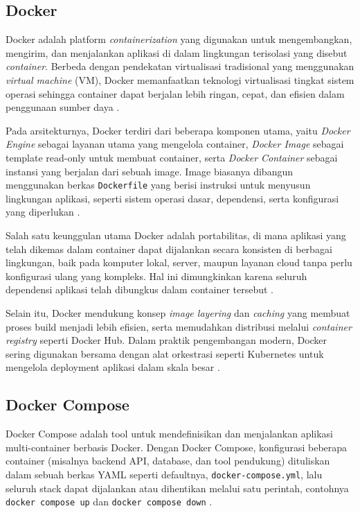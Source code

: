 \documentclass[a4paper,oneside,11pt]{book}
\begin{document}
\subsection{Docker}

\par Docker adalah platform \textit{containerization} yang digunakan untuk mengembangkan, mengirim, dan menjalankan aplikasi di dalam lingkungan terisolasi yang disebut \textit{container}. Berbeda dengan pendekatan virtualisasi tradisional yang menggunakan \textit{virtual machine} (VM), Docker memanfaatkan teknologi virtualisasi tingkat sistem operasi sehingga container dapat berjalan lebih ringan, cepat, dan efisien dalam penggunaan sumber daya \cite{docker-docs}.

\par Pada arsitekturnya, Docker terdiri dari beberapa komponen utama, yaitu \textit{Docker Engine} sebagai layanan utama yang mengelola container, \textit{Docker Image} sebagai template read-only untuk membuat container, serta \textit{Docker Container} sebagai instansi yang berjalan dari sebuah image. Image biasanya dibangun menggunakan berkas \texttt{Dockerfile} yang berisi instruksi untuk menyusun lingkungan aplikasi, seperti sistem operasi dasar, dependensi, serta konfigurasi yang diperlukan \cite{docker-docs}.

\par Salah satu keunggulan utama Docker adalah portabilitas, di mana aplikasi yang telah dikemas dalam container dapat dijalankan secara konsisten di berbagai lingkungan, baik pada komputer lokal, server, maupun layanan cloud tanpa perlu konfigurasi ulang yang kompleks. Hal ini dimungkinkan karena seluruh dependensi aplikasi telah dibungkus dalam container tersebut \cite{docker-docs}.

\par Selain itu, Docker mendukung konsep \textit{image layering} dan \textit{caching} yang membuat proses build menjadi lebih efisien, serta memudahkan distribusi melalui \textit{container registry} seperti Docker Hub. Dalam praktik pengembangan modern, Docker sering digunakan bersama dengan alat orkestrasi seperti Kubernetes untuk mengelola deployment aplikasi dalam skala besar \cite{docker-docs}.

\subsection{Docker Compose}

\par Docker Compose adalah tool untuk mendefinisikan dan menjalankan aplikasi multi-container berbasis Docker. Dengan Docker Compose, konfigurasi beberapa container (misalnya backend API, database, dan tool pendukung) dituliskan dalam sebuah berkas YAML seperti defaultnya, \texttt{docker-compose.yml}, lalu seluruh stack dapat dijalankan atau dihentikan melalui satu perintah, contohnya \texttt{docker compose up} dan \texttt{docker compose down} \cite{docker-compose-docs}.
\end{document}
